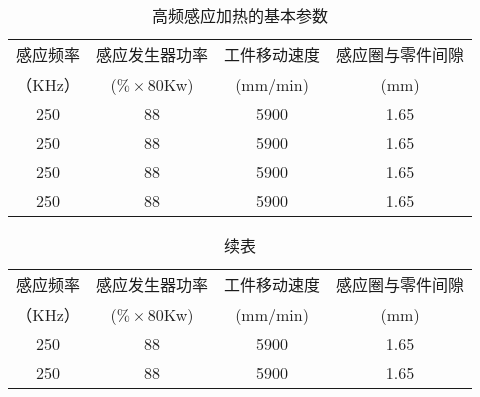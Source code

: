 \begin{table}[H]
    \centering
    \caption{高频感应加热的基本参数}
    \begin{tabular}{|c| c|c|c|}
    \hline
    感应频率 &感应发生器功率 & 工件移动速度  &感应圈与零件间隙\\
    （KHz）&($\% \times$80Kw) &(mm/min)  &(mm)\\
    \hline
    250 &88 &5900 &1.65\\
    \hline
    250 &88 &5900 &1.65\\
    \hline
    250 &88 &5900 &1.65\\
    \hline
    250 &88 &5900 &1.65\\
    \hline
    \end{tabular}
\end{table}


\begin{table}[H]
    \centering
    \captionsetup{singlelinecheck=off}
    \caption*{续表} %
    \begin{tabular}{|c| c|c|c|}
    \hline
    感应频率 &感应发生器功率 & 工件移动速度  &感应圈与零件间隙\\
    （KHz）&($\% \times$80Kw) &(mm/min)  &(mm)\\
    \hline
    250 &88 &5900 &1.65\\
    \hline
    250 &88 &5900 &1.65\\
    \hline
    \end{tabular}
\end{table}
